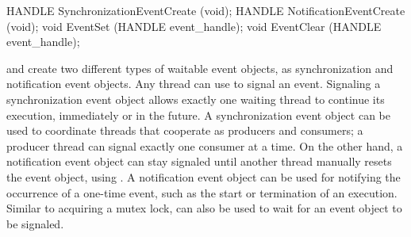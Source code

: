 \begin{paldef}
HANDLE SynchronizationEventCreate (void);
HANDLE NotificationEventCreate    (void);
void   EventSet   (HANDLE event_handle);
void   EventClear (HANDLE event_handle);
\end{paldef}






 and  create two different types of waitable event objects, as synchronization and notification event objects.
Any thread can use  to signal an event.
Signaling a synchronization event object allows exactly one waiting thread to continue its execution,
immediately or in the future.
A synchronization event object can be used to coordinate threads that cooperate as producers and consumers;
a producer thread can signal exactly one consumer at a time.
On the other hand, a notification event object can stay signaled until another thread
manually resets the event object, using .
A notification event object can be used for notifying the occurrence of a one-time event,
such as the start or termination of an execution.
Similar to acquiring a mutex lock,
 can also be used
to wait for an event object to be signaled.




